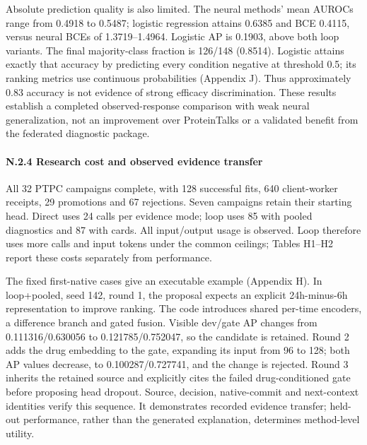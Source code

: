 \begin{table}[t]

\end{table}

Absolute prediction quality is also limited. The neural methods' mean
AUROCs range from 0.4918 to 0.5487; logistic regression attains 0.6385
and BCE 0.4115, versus neural BCEs of 1.3719--1.4964. Logistic AP is
0.1903, above both loop variants. The final majority-class fraction is
126/148 (0.8514). Logistic attains exactly that accuracy by predicting every
condition negative at threshold 0.5; its ranking metrics use continuous
probabilities (Appendix J). Thus approximately 0.83 accuracy is not evidence
of strong efficacy discrimination. These results establish a completed observed-response
comparison with weak neural generalization, not an improvement over
ProteinTalks or a validated benefit from the federated diagnostic package.

\paragraph{N.2.4 Research cost and observed evidence transfer}
All 32 PTPC campaigns complete, with 128 successful fits, 640 client-worker receipts, 29 promotions and 67 rejections. Seven campaigns retain their starting head. Direct uses 24 calls per evidence mode; loop uses 85 with pooled diagnostics and 87 with cards. All input/output usage is observed. Loop therefore uses more calls and input tokens under the common ceilings; Tables H1--H2 report these costs separately from performance.

The fixed first-native cases give an executable example (Appendix H). In loop+pooled, seed 142, round 1, the proposal expects an explicit 24h-minus-6h representation to improve ranking. The code introduces shared per-time encoders, a difference branch and gated fusion. Visible dev/gate AP changes from 0.111316/0.630056 to 0.121785/0.752047, so the candidate is retained. Round 2 adds the drug embedding to the gate, expanding its input from 96 to 128; both AP values decrease, to 0.100287/0.727741, and the change is rejected. Round 3 inherits the retained source and explicitly cites the failed drug-conditioned gate before proposing head dropout. Source, decision, native-commit and next-context identities verify this sequence. It demonstrates recorded evidence transfer; held-out performance, rather than the generated explanation, determines method-level utility.

\endgroup
